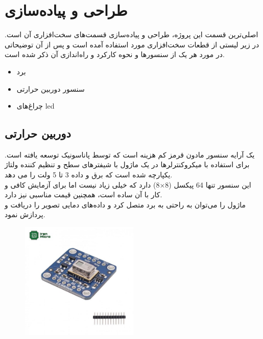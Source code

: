 \section{طراحی و پیاده‌سازی}

اصلی‌ترین قسمت این پروژه، طراحی و پیاده‌سازی قسمت‌های سخت‌افزاری آن است. در زیر لیستی از قطعات سخت‌افزاری مورد استفاده آمده است و پس‌ از آن توضیحاتی در مورد هر یک از سنسور‌ها و نحوه کارکرد و راه‌اندازی آن ذکر شده است.


\begin{itemize}
	\item برد 
	\item سنسور دوربین حرارتی  
	\item چراغ‌های led
\end{itemize}


\subsection{دوربین حرارتی}

یک آرایه سنسور مادون قرمز کم هزینه است که توسط پاناسونیک توسعه یافته است. برای استفاده با میکروکنترلرها در یک ماژول با شیفترهای سطح و تنظیم کننده ولتاژ یکپارچه شده است که برق و داده 3 تا 5 ولت را می دهد.
\\
این سنسور تنها 64 پیکسل (8×8) دارد که خیلی زیاد نیست اما برای آزمایش کافی و کار با آن ساده است، همچنین قیمت مناسبی نیز دارد. 
\\
ماژول را می‌توان به راحتی به برد متصل کرد و داده‌های دمایی تصویر را دریافت و پردازش نمود.

\begin{figure}[H]
	\begin{center}
		\includegraphics[width=0.5\textwidth]{figs/AMG8833-module-1-500x500 (1).jpg}
	\end{center}
	\caption{}
\end{figure}


